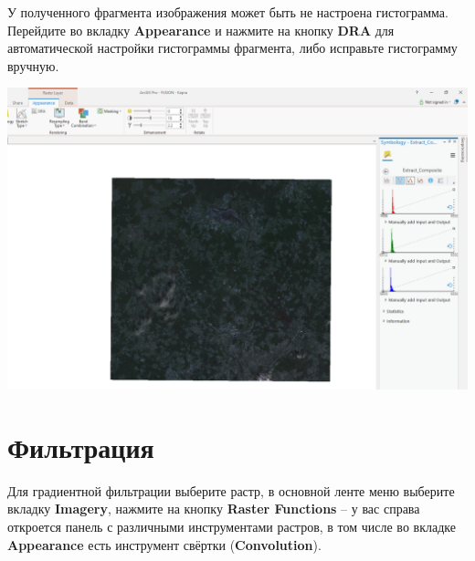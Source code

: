 \documentclass[
  12pt,
]{book}
\begin{document}
У полученного фрагмента изображения может быть не настроена гистограмма. Перейдите во вкладку \textbf{Appearance} и нажмите на кнопку \textbf{DRA} для автоматической настройки гистограммы фрагмента, либо исправьте гистограмму вручную.

\includegraphics{images/Ref01/Stretching.png}

\hypertarget{pansharpen-filter}{%
\section{Фильтрация}\label{pansharpen-filter}}

Для градиентной фильтрации выберите растр, в основной ленте меню выберите вкладку \textbf{Imagery}, нажмите на кнопку \textbf{Raster Functions} -- у вас справа откроется панель с различными инструментами растров, в том числе во вкладке \textbf{Appearance} есть инструмент свёртки (\textbf{Convolution}).
\end{document}
